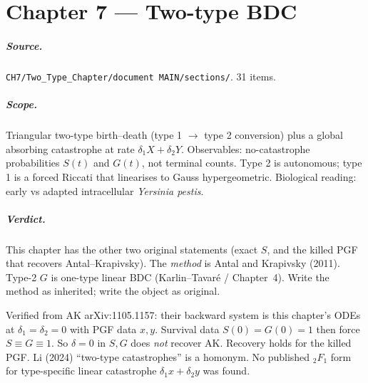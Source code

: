 \documentclass[11pt,a4paper]{report}
\newcommand{\yp}{\textit{Yersinia pestis}}
\begin{document}
\chapter{Chapter 7 --- Two-type BDC}
\label{ch:7}

\paragraph{Source.} \texttt{CH7/Two\_Type\_Chapter/document MAIN/sections/}.
31 items.

\paragraph{Scope.}
Triangular two-type birth--death (type 1 \(\to\) type 2 conversion) plus
a global absorbing catastrophe at rate \(\delta_1 X+\delta_2 Y\).
Observables: no-catastrophe probabilities \(S(t)\) and \(G(t)\), not
terminal counts. Type 2 is autonomous; type 1 is a forced Riccati that
linearises to Gauss hypergeometric. Biological reading: early vs adapted
intracellular \yp{}.

\paragraph{Verdict.}
This chapter has the other two original statements (exact \(S\), and the
killed PGF that recovers Antal--Krapivsky). The \emph{method} is Antal and
Krapivsky (2011). Type-2 \(G\) is one-type linear BDC (Karlin--Tavar\'e /
Chapter~4). Write the method as inherited; write the object as original.

Verified from AK arXiv:1105.1157: their backward system is this chapter's
ODEs at \(\delta_1=\delta_2=0\) with PGF data \(x,y\). Survival data
\(S(0)=G(0)=1\) then force \(S\equiv G\equiv 1\). So \(\delta=0\) in
\(S,G\) does \emph{not} recover AK. Recovery holds for the killed PGF.
Li (2024) ``two-type catastrophes'' is a homonym. No published
\({}_2F_1\) form for type-specific linear catastrophe \(\delta_1 x+\delta_2 y\)
was found.
\end{document}
